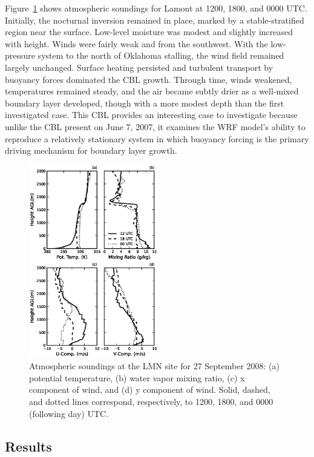 Figure~\ref{figure411} shows atmospheric soundings for Lamont at 1200, 1800, and 0000 UTC. Initially, the nocturnal inversion remained in place, marked by a stable-stratified region near the surface. Low-level moisture was modest and slightly increased with height. Winds were fairly weak and from the southwest. With the low-pressure system to the north of Oklahoma stalling, the wind field remained largely unchanged. Surface heating persisted and turbulent transport by buoyancy forces dominated the CBL growth. Through time, winds weakened, temperatures remained steady, and the air became subtly drier as a well-mixed boundary layer developed, though with a more modest depth than the first investigated case. This CBL provides an interesting case to investigate because unlike the CBL present on June 7, 2007, it examines the WRF model's ability to reproduce a relatively stationary system in which buoyancy forcing is the primary driving mechanism for boundary layer growth.


\begin{figure}[H]
\begin{center}
\includegraphics[width=0.5\textwidth]{figures/chapter4/20080927_lmnsounding}
\end{center}
\caption{Atmospheric soundings at the LMN site for 27 September 2008: (a) potential temperature, (b) water vapor mixing ratio, (c) x component of wind, and (d) y component of wind. Solid, dashed, and dotted lines correspond, respectively, to 1200, 1800, and 0000 (following day) UTC.}
\label{figure411}
\end{figure}


\subsection{Results}
\label{res-442}

